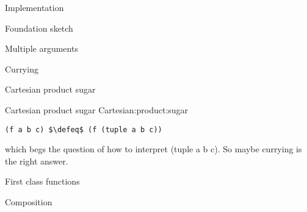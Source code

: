 \documentclass[11pt]{PalisadesLakesBook}
\begin{document}
\begin{plSection}{Implementation}
\begin{plSection}{Foundation sketch}
\begin{plSection}{Multiple arguments}
\begin{plSection}{Currying}
\end{plSection}%
\begin{plSection}{Cartesian product sugar}

\begin{plListing}
{Cartesian product sugar}
{Cartesian:product:sugar}
\begin{lstlisting}[language=pseudocode]
(f a b c) $\defeq$ (f (tuple a b c))
\end{lstlisting}
\end{plListing}
which begs the question of how to interpret
{\pseudocodeFont (tuple a b c)}.
So maybe currying is the right answer.

\end{plSection}%
\end{plSection}%
\end{plSection}%
\begin{plSection}{First class functions} 
\begin{plSection}{Composition}\label{sec:Compose}

\end{plSection}%
\end{plSection}%
\end{plSection}%
\end{document}

